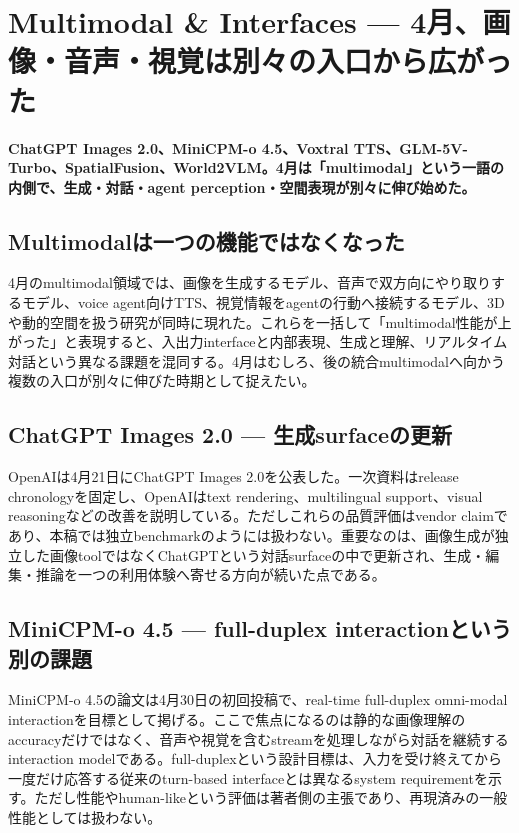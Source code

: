 \section{Multimodal \& Interfaces — 4月、画像・音声・視覚は別々の入口から広がった}
\noindent\textbf{ChatGPT Images 2.0、MiniCPM-o 4.5、Voxtral TTS、GLM-5V-Turbo、SpatialFusion、World2VLM。4月は「multimodal」という一語の内側で、生成・対話・agent perception・空間表現が別々に伸び始めた。}\autocite{src-0f697d747d9c,src-d113b486a585,src-d33ba68aac3c,src-d8b7c1c36830}

\subsection{Multimodalは一つの機能ではなくなった}

4月のmultimodal領域では、画像を生成するモデル、音声で双方向にやり取りするモデル、voice agent向けTTS、視覚情報をagentの行動へ接続するモデル、3Dや動的空間を扱う研究が同時に現れた。これらを一括して「multimodal性能が上がった」と表現すると、入出力interfaceと内部表現、生成と理解、リアルタイム対話という異なる課題を混同する。4月はむしろ、後の統合multimodalへ向かう複数の入口が別々に伸びた時期として捉えたい。\autocite{src-0f697d747d9c,src-3fa7f7c1140f,src-d113b486a585,src-d33ba68aac3c,src-d8b7c1c36830,src-fec81b98fdc8}


\subsection{ChatGPT Images 2.0 — 生成surfaceの更新}

OpenAIは4月21日にChatGPT Images 2.0を公表した。一次資料はrelease chronologyを固定し、OpenAIはtext rendering、multilingual support、visual reasoningなどの改善を説明している。ただしこれらの品質評価はvendor claimであり、本稿では独立benchmarkのようには扱わない。重要なのは、画像生成が独立した画像toolではなくChatGPTという対話surfaceの中で更新され、生成・編集・推論を一つの利用体験へ寄せる方向が続いた点である。\autocite{src-0f697d747d9c}


\subsection{MiniCPM-o 4.5 — full-duplex interactionという別の課題}

MiniCPM-o 4.5の論文は4月30日の初回投稿で、real-time full-duplex omni-modal interactionを目標として掲げる。ここで焦点になるのは静的な画像理解のaccuracyだけではなく、音声や視覚を含むstreamを処理しながら対話を継続するinteraction modelである。full-duplexという設計目標は、入力を受け終えてから一度だけ応答する従来のturn-based interfaceとは異なるsystem requirementを示す。ただし性能やhuman-likeという評価は著者側の主張であり、再現済みの一般性能としては扱わない。\autocite{src-d33ba68aac3c}


